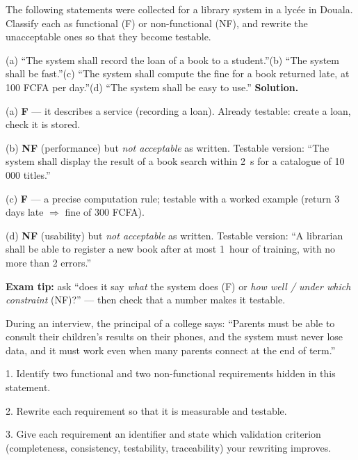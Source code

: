 \documentclass[11pt]{article}
\begin{document}
\begin{exoresolu}
The following statements were collected for a library system in a lycée in Douala. Classify each as functional (F) or non-functional (NF), and rewrite the unacceptable ones so that they become testable.\par
(a) ``The system shall record the loan of a book to a student.''\quad (b) ``The system shall be fast.''\quad (c) ``The system shall compute the fine for a book returned late, at 100 FCFA per day.''\quad (d) ``The system shall be easy to use.''
\tcblower
\textbf{Solution.}\par
(a) \textbf{F} --- it describes a service (recording a loan). Already testable: create a loan, check it is stored.\par
(b) \textbf{NF} (performance) but \emph{not acceptable} as written. Testable version: ``The system shall display the result of a book search within \SI{2}{s} for a catalogue of 10\,000 titles.''\par
(c) \textbf{F} --- a precise computation rule; testable with a worked example (return 3 days late $\Rightarrow$ fine of 300 FCFA).\par
(d) \textbf{NF} (usability) but \emph{not acceptable} as written. Testable version: ``A librarian shall be able to register a new book after at most \SI{1}{hour} of training, with no more than 2 errors.''\par
\textbf{Exam tip:} ask ``does it say \emph{what} the system does (F) or \emph{how well / under which constraint} (NF)?'' --- then check that a number makes it testable.
\end{exoresolu}

\begin{exercice}
During an interview, the principal of a college says: ``Parents must be able to consult their children's results on their phones, and the system must never lose data, and it must work even when many parents connect at the end of term.''\par
1. Identify two functional and two non-functional requirements hidden in this statement.\par
2. Rewrite each requirement so that it is measurable and testable.\par
3. Give each requirement an identifier and state which validation criterion (completeness, consistency, testability, traceability) your rewriting improves.
\end{exercice}
\end{document}

